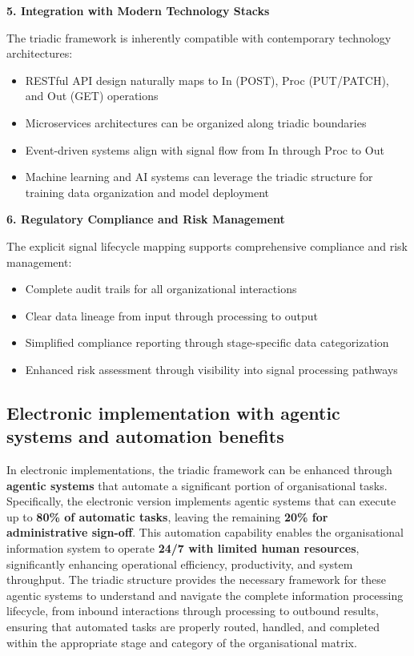 \documentclass[11pt,a4paper]{article}
\begin{document}
\textbf{5. Integration with Modern Technology Stacks}

The triadic framework is inherently compatible with contemporary technology architectures:
\begin{itemize}[noitemsep]
  \item RESTful API design naturally maps to In (POST), Proc (PUT/PATCH), and Out (GET) operations
  \item Microservices architectures can be organized along triadic boundaries
  \item Event-driven systems align with signal flow from In through Proc to Out
  \item Machine learning and AI systems can leverage the triadic structure for training data organization and model deployment
\end{itemize}

\textbf{6. Regulatory Compliance and Risk Management}

The explicit signal lifecycle mapping supports comprehensive compliance and risk management:
\begin{itemize}[noitemsep]
  \item Complete audit trails for all organizational interactions
  \item Clear data lineage from input through processing to output
  \item Simplified compliance reporting through stage-specific data categorization
  \item Enhanced risk assessment through visibility into signal processing pathways
\end{itemize}

\subsection*{Electronic implementation with agentic systems and automation benefits}

In electronic implementations, the triadic framework can be enhanced through \textbf{agentic systems} that automate a significant portion of organisational tasks. Specifically, the electronic version implements agentic systems that can execute up to \textbf{80\% of automatic tasks}, leaving the remaining \textbf{20\% for administrative sign-off}. This automation capability enables the organisational information system to operate \textbf{24/7 with limited human resources}, significantly enhancing operational efficiency, productivity, and system throughput. The triadic structure provides the necessary framework for these agentic systems to understand and navigate the complete information processing lifecycle, from inbound interactions through processing to outbound results, ensuring that automated tasks are properly routed, handled, and completed within the appropriate stage and category of the organisational matrix.
\end{document}
